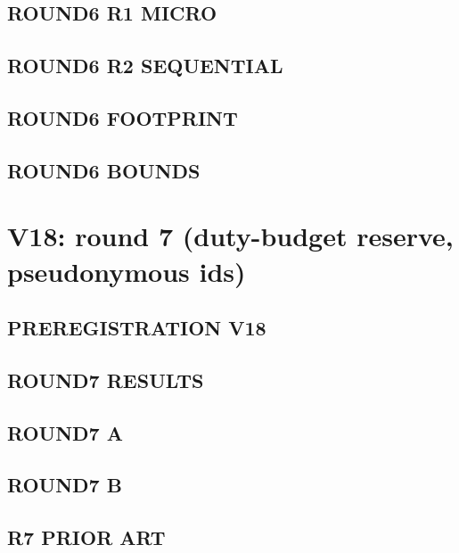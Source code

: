 \documentclass[10pt,a4paper]{article}
\begin{document}
\subsection{ROUND6 R1 MICRO}


\subsection{ROUND6 R2 SEQUENTIAL}


\subsection{ROUND6 FOOTPRINT}


\subsection{ROUND6 BOUNDS}


\section{V18: round 7 (duty-budget reserve, pseudonymous ids)}

\subsection{PREREGISTRATION V18}


\subsection{ROUND7 RESULTS}


\subsection{ROUND7 A}


\subsection{ROUND7 B}


\subsection{R7 PRIOR ART}

\end{document}
